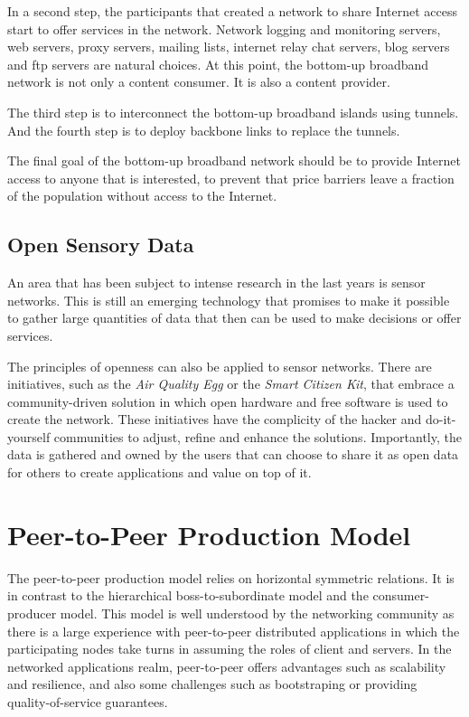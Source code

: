 \documentclass[journal]{IEEEtran}
\begin{document}
In a second step, the participants that created a network to share Internet access start to offer services in the network.
Network logging and monitoring servers, web servers, proxy servers, mailing lists, internet relay chat servers, blog servers and ftp servers are natural choices.
At this point, the bottom-up broadband network is not only a content consumer.
It is also a content provider.

The third step is to interconnect the bottom-up broadband islands using tunnels.
And the fourth step is to deploy backbone links to replace the tunnels.

The final goal of the bottom-up broadband network should be to provide Internet access to anyone that is interested, to prevent that price barriers leave a fraction of the population without access to the Internet.


\subsection{Open Sensory Data}

An area that has been subject to intense research in the last years is sensor networks.
This is still an emerging technology that promises to make it possible to gather large quantities of data that then can be used to make decisions or offer services.

The principles of openness can also be applied to sensor networks.
There are initiatives, such as the \emph{Air Quality Egg} or the \emph{Smart Citizen Kit}, that embrace a community-driven solution in which open hardware and free software is used to create the network.
These initiatives have the complicity of the hacker and do-it-yourself communities to adjust, refine and enhance the solutions.
Importantly, the data is gathered and owned by the users that can choose to share it as open data for others to create applications and value on top of it.


\section{Peer-to-Peer Production Model}
The peer-to-peer production model \cite{bauwens2009class} relies on horizontal symmetric relations.
It is in contrast to the hierarchical boss-to-subordinate model and the consumer-producer model.
This model is well understood by the networking community as there is a large experience with peer-to-peer distributed applications in which the participating nodes take turns in assuming the roles of client and servers.
In the networked applications realm, peer-to-peer offers advantages such as scalability and resilience, and also some challenges such as bootstraping or providing quality-of-service guarantees.
\end{document}
